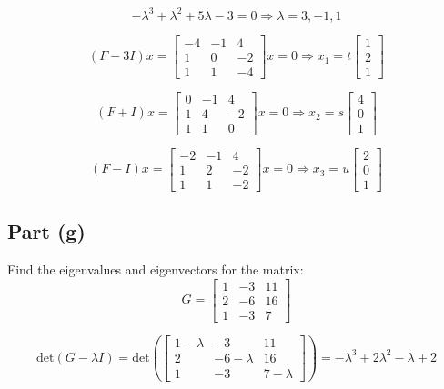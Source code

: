 \documentclass[12pt]{article}
\begin{document}
\[
  -\lambda^3 + \lambda^2 + 5\lambda - 3 = 0 \Rightarrow \lambda = 3, -1, 1
\]

\[
  (F - 3I)x = \begin{bmatrix} -4 & -1 & 4 \\ 1 & 0 & -2 \\ 1 & 1 & -4 \end{bmatrix}x = 0 \Rightarrow x_1 = t\begin{bmatrix} 1 \\ 2 \\ 1 \end{bmatrix}
\]

\[
  (F + I)x = \begin{bmatrix} 0 & -1 & 4 \\ 1 & 4 & -2 \\ 1 & 1 & 0 \end{bmatrix}x = 0 \Rightarrow x_2 = s\begin{bmatrix} 4 \\ 0 \\ 1 \end{bmatrix}
\]

\[
  (F - I)x = \begin{bmatrix} -2 & -1 & 4 \\ 1 & 2 & -2 \\ 1 & 1 & -2 \end{bmatrix}x = 0 \Rightarrow x_3 = u\begin{bmatrix} 2 \\ 0 \\ 1 \end{bmatrix}
\]

\pagebreak

\subsection*{Part (g)}
Find the eigenvalues and eigenvectors for the matrix:
\[
  G = \begin{bmatrix} 1 & -3 & 11 \\ 2 & -6 & 16 \\ 1 & -3 & 7 \end{bmatrix}
\]

\[
  \text{det}(G - \lambda I) = \text{det}\left(\begin{bmatrix} 1-\lambda & -3 & 11 \\ 2 & -6-\lambda & 16 \\ 1 & -3 & 7-\lambda \end{bmatrix}\right) = -\lambda^3 + 2\lambda^2 - \lambda + 2
\]
\end{document}
